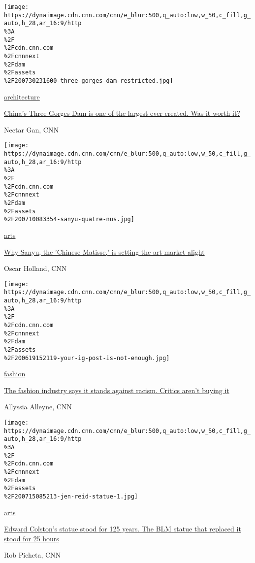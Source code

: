 \texttt{[image: https://dynaimage.cdn.cnn.com/cnn/e\_blur:500,q\_auto:low,w\_50,c\_fill,g\_auto,h\_28,ar\_16:9/http\\\%3A\\\%2F\\\%2Fcdn.cnn.com\\\%2Fcnnnext\\\%2Fdam\\\%2Fassets\\\%2F200730231600-three-gorges-dam-restricted.jpg]}

\href{/style/architecture}{architecture}

\href{/style/article/china-three-gorges-dam-intl-hnk-dst/index.html}{China's
Three Gorges Dam is one of the largest ever created. Was it worth it?}

Nectar Gan, CNN

\href{/style/article/sanyu-hong-kong-auction/index.html}{}

\texttt{[image: https://dynaimage.cdn.cnn.com/cnn/e\_blur:500,q\_auto:low,w\_50,c\_fill,g\_auto,h\_28,ar\_16:9/http\\\%3A\\\%2F\\\%2Fcdn.cnn.com\\\%2Fcnnnext\\\%2Fdam\\\%2Fassets\\\%2F200710083354-sanyu-quatre-nus.jpg]}

\href{/style/arts}{arts}

\href{/style/article/sanyu-hong-kong-auction/index.html}{Why Sanyu, the
'Chinese Matisse,' is setting the art market alight}

Oscar Holland, CNN

\href{/style/article/fashion-industry-black-lives-matter/index.html}{}

\texttt{[image: https://dynaimage.cdn.cnn.com/cnn/e\_blur:500,q\_auto:low,w\_50,c\_fill,g\_auto,h\_28,ar\_16:9/http\\\%3A\\\%2F\\\%2Fcdn.cnn.com\\\%2Fcnnnext\\\%2Fdam\\\%2Fassets\\\%2F200619152119-your-ig-post-is-not-enough.jpg]}

\href{/style/fashion}{fashion}

\href{/style/article/fashion-industry-black-lives-matter/index.html}{The
fashion industry says it stands against racism. Critics aren't buying
it}

Allyssia Alleyne, CNN

\href{/style/article/black-lives-matter-bristol-statue-removed-scli-gbr-intl/index.html}{}

\texttt{[image: https://dynaimage.cdn.cnn.com/cnn/e\_blur:500,q\_auto:low,w\_50,c\_fill,g\_auto,h\_28,ar\_16:9/http\\\%3A\\\%2F\\\%2Fcdn.cnn.com\\\%2Fcnnnext\\\%2Fdam\\\%2Fassets\\\%2F200715085213-jen-reid-statue-1.jpg]}

\href{/style/arts}{arts}

\href{/style/article/black-lives-matter-bristol-statue-removed-scli-gbr-intl/index.html}{Edward
Colston's statue stood for 125 years. The BLM statue that replaced it
stood for 25 hours}

Rob Picheta, CNN

